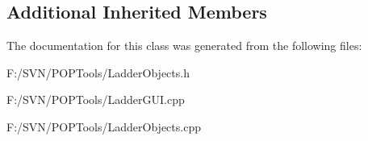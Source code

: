 \subsection*{Additional Inherited Members}


The documentation for this class was generated from the following files\-:\begin{DoxyCompactItemize}
\item 
F\-:/\-S\-V\-N/\-P\-O\-P\-Tools/Ladder\-Objects.\-h\item 
F\-:/\-S\-V\-N/\-P\-O\-P\-Tools/Ladder\-G\-U\-I.\-cpp\item 
F\-:/\-S\-V\-N/\-P\-O\-P\-Tools/Ladder\-Objects.\-cpp\end{DoxyCompactItemize}
